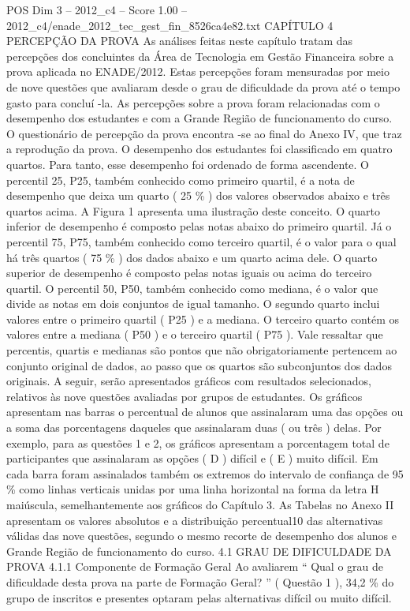 \begin{textsample}{POS Dim 3 – 2012\_c4 – Score 1.00 – 2012\_c4/enade\_2012\_tec\_gest\_fin\_8526ca4e82.txt}  \label{ex:f3_pos_156}
CAPÍTULO 4 PERCEPÇÃO DA PROVA As análises feitas neste capítulo tratam das percepções dos concluintes da Área de Tecnologia em Gestão Financeira sobre a prova aplicada no ENADE/2012.
Estas percepções foram mensuradas por meio de nove questões que avaliaram desde o grau de dificuldade da prova até o tempo gasto para concluí -la.
As percepções sobre a prova foram relacionadas com o desempenho dos estudantes e com a Grande Região de funcionamento do curso.
O questionário de percepção da prova encontra -se ao final do Anexo IV, que traz a reprodução da prova.
O desempenho dos estudantes foi classificado em quatro quartos.
Para tanto, esse desempenho foi ordenado de forma ascendente.
O percentil 25, P25, também conhecido como primeiro quartil, é a nota de desempenho que deixa um quarto ( 25 \% ) dos valores observados abaixo e três quartos acima.
A Figura 1 apresenta uma ilustração deste conceito.
O quarto inferior de desempenho é composto pelas notas abaixo do primeiro quartil.
Já o percentil 75, P75, também conhecido como terceiro quartil, é o valor para o qual há três quartos ( 75 \% ) dos dados abaixo e um quarto acima dele.
O quarto superior de desempenho é composto pelas notas iguais ou acima do terceiro quartil.
O percentil 50, P50, também conhecido como mediana, é o valor que divide as notas em dois conjuntos de igual tamanho.
O segundo quarto inclui valores entre o primeiro quartil ( P25 ) e a mediana.
O terceiro quarto contém os valores entre a mediana ( P50 ) e o terceiro quartil ( P75 ).
Vale ressaltar que percentis, quartis e medianas são pontos que não obrigatoriamente pertencem ao conjunto original de dados, ao passo que os quartos são subconjuntos dos dados originais.
A seguir, serão apresentados gráficos com resultados selecionados, relativos às nove questões avaliadas por grupos de estudantes.
Os gráficos apresentam nas barras o percentual de alunos que assinalaram uma das opções ou a soma das porcentagens daqueles que assinalaram duas ( ou três ) delas.
Por exemplo, para as questões 1 e 2, os gráficos apresentam a porcentagem total de participantes que assinalaram as opções ( D ) difícil e ( E ) muito difícil.
Em cada barra foram assinalados também os extremos do intervalo de confiança de 95 \% como linhas verticais unidas por uma linha horizontal na forma da letra H maiúscula, semelhantemente aos gráficos do Capítulo 3.
As Tabelas no Anexo II apresentam os valores absolutos e a distribuição percentual10 das alternativas válidas das nove questões, segundo o mesmo recorte de desempenho dos alunos e Grande Região de funcionamento do curso. 4.1 GRAU DE DIFICULDADE DA PROVA 4.1.1 Componente de Formação Geral Ao avaliarem “ Qual o grau de dificuldade desta prova na parte de Formação Geral? ” ( Questão 1 ), 34,2 \% do grupo de inscritos e presentes optaram pelas alternativas difícil ou muito difícil.

\end{textsample}
